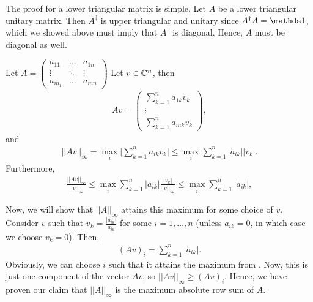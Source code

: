 The proof for a lower triangular matrix is simple. 
Let $A$ be a lower triangular unitary matrix.
Then $A^{\dagger}$ is upper triangular and unitary since $A^{\dagger} A = \id$, which we showed above must imply that $A^{\dagger}$ is diagonal.
Hence, $A$ must be diagonal as well.



Let $A = \begin{pmatrix}
    a_{11} & \ldots & a_{1n} \\
    \vdots & \ddots & \vdots \\
    a_{m_1} & \ldots & a_{mn}
\end{pmatrix}
$
Let $v \in \mathbb{C}^{n}$, then
\begin{eqnarray}
    \label{eq:Av}
    Av = \begin{pmatrix}
    \sum_{k=1}^{n} a_{1k}v_{k} \\
        \vdots \\
        \sum_{k=1}^{n} a_{mk}v_{k}
    \end{pmatrix}
,\end{eqnarray}
and
\begin{eqnarray}
    \label{eq:infty-norm-Av}
    || Av ||_{\infty} = \max_{i} \Bigg|\sum_{k=1}^{n} a_{ik}v_{k}\Bigg| \leq \max_{i} \sum_{k=1}^{n} |a_{ik}||v_{k}|
.\end{eqnarray}
Furthermore,
\begin{eqnarray}
    \label{eq:infty-norm-Av-div-norm-v}
    \frac{||Av||_{\infty}}{||v||_{\infty}} \leq \max_{i} \sum_{k=1}^{n} |a_{ik}|\frac{|v_{k}|}{||v||_{\infty}} \leq \max_{i} \sum_{k=1}^{n} |a_{ik}|
,\end{eqnarray}

Now, we will show that $||A||_{\infty}$ attains this maximum for some choice of $v$.
Consider $v$ such that $\displaystyle v_{k} = \frac{|a_{ik}|}{a_{ik}}$ for some $i = 1,\ldots,n$ (unless $a_{ik} = 0$, in which case we choose $v_{k} = 0$).
Then, 
\begin{eqnarray}
    \label{eq:Av-particular-v}
    (Av)_{i} = \sum_{k=1}^{n} |a_{ik}|
.\end{eqnarray}
Obviously, we can choose $i$ such that it attains the maximum from .
Now, this is just one component of the vector $Av$, so $||Av||_{\infty} \geq (Av)_{i}$.
Hence, we have proven our claim that $||A||_{\infty}$ is the maximum absolute row sum of $A$.



